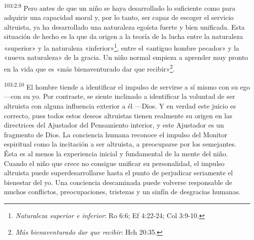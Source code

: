 \par
\textsuperscript{103:2.9} Pero antes de que un niño se haya desarrollado lo suficiente como para adquirir una capacidad moral y, por lo tanto, ser capaz de escoger el servicio altruista, ya ha desarrollado una naturaleza egoísta fuerte y bien unificada. Esta situación de hecho es la que da origen a la teoría de la lucha entre la naturaleza «superior» y la naturaleza «inferior»\footnote{\textit{Naturaleza superior e inferior}: Ro 6:6; Ef 4:22-24; Col 3:9-10.}, entre el «antiguo hombre pecador» y la «nueva naturaleza» de la gracia. Un niño normal empieza a aprender muy pronto en la vida que es «más bienaventurado dar que recibir»\footnote{\textit{Más bienaventurado dar que recibir}: Hch 20:35.}.

\par
\textsuperscript{103:2.10} El hombre tiende a identificar el impulso de servirse a sí mismo con su ego ---con su yo. Por contraste, se siente inclinado a identificar la voluntad de ser altruista con alguna influencia exterior a él ---Dios. Y en verdad este juicio es correcto, pues todos estos deseos altruistas tienen realmente su origen en las directrices del Ajustador del Pensamiento interior, y este Ajustador es un fragmento de Dios. La conciencia humana reconoce el impulso del Monitor espiritual como la incitación a ser altruista, a preocuparse por los semejantes. Ésta es al menos la experiencia inicial y fundamental de la mente del niño. Cuando el niño que crece no consigue unificar su personalidad, el impulso altruista puede superdesarrollarse hasta el punto de perjudicar seriamente el bienestar del yo. Una conciencia descaminada puede volverse responsable de muchos conflictos, preocupaciones, tristezas y un sinfín de desgracias humanas.

